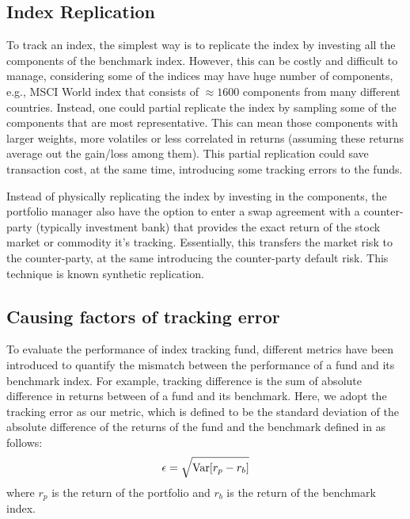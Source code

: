 \subsection{Index Replication}
To track an index, the simplest way is to replicate the index by investing all the components of the benchmark index. However, this can be costly and difficult to manage, considering some of the indices may have huge number of components, e.g., MSCI World index that consists of $\approx 1600$ components from many different countries. Instead, one could partial replicate the index by sampling some of the components that are most representative. This can mean those components with larger weights, more volatiles or less correlated in returns (assuming these returns average out the gain/loss among them). This partial replication could save transaction cost, at the same time, introducing some tracking errors to the funds.
 
Instead of physically replicating the index by investing in the components, the portfolio manager also have the option to enter a swap agreement with a counter-party (typically investment bank) that provides the exact return of the stock market or commodity it's tracking. Essentially, this transfers the market risk to the counter-party, at the same introducing the counter-party default risk. This technique is known synthetic replication.
 
\subsection{Causing factors of tracking error}
To evaluate the performance of index tracking fund, different metrics have been introduced to quantify the mismatch between the performance of a fund and its benchmark index. For example, tracking difference is the sum of absolute difference in returns between of a fund and its benchmark. Here, we adopt the tracking error as our metric, which is defined to be the standard deviation of the absolute difference of the returns of the fund and the benchmark defined in \cite{BJ13} as follows:
\begin{equation}
  \epsilon = \sqrt{\operatorname{{\mathrm{Var}}}[r_p - r_b]}
\end{equation}
where $r_p$ is the return of the portfolio and $r_b$ is the return of the benchmark index.
 
